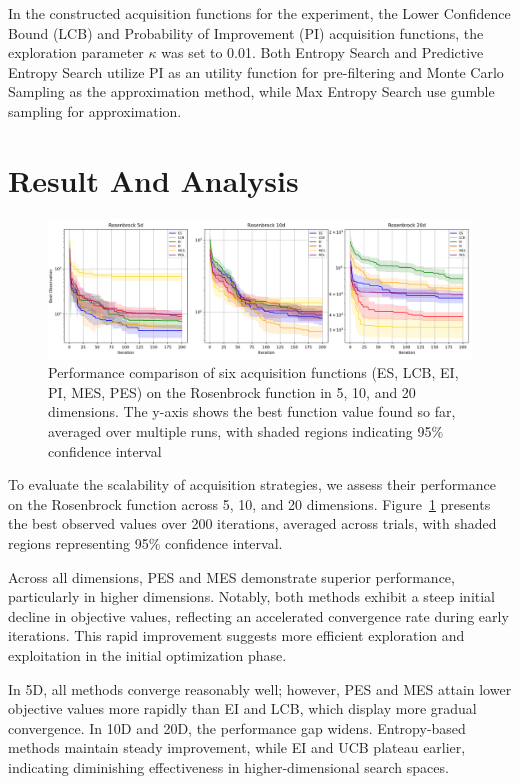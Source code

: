 \documentclass{ut-thesis}
\begin{document}
In the constructed acquisition functions for the experiment, the Lower Confidence Bound (LCB) and Probability of Improvement (PI) acquisition functions, the exploration parameter $\kappa$ was set to 0.01. Both Entropy Search and Predictive Entropy Search utilize PI as an utility function for pre-filtering and Monte Carlo Sampling as the approximation method, while Max Entropy Search use gumble sampling for approximation.
 

\section{Result And Analysis}

\begin{figure}[!t]
    \centering
    \includegraphics[width=\textwidth]{rosenbrock 51020d.png}
    \caption[Acquisition function comparison on Rosenbrock Function with different dimension]{Performance comparison of six acquisition functions (ES, LCB, EI, PI, MES, PES) on the Rosenbrock function in 5, 10, and 20 dimensions. The y-axis shows the best function value found so far, averaged over multiple runs, with shaded regions indicating 95\% confidence interval}
    \label{fig:rosenbrock_comparison}
\end{figure}

To evaluate the scalability of acquisition strategies, we assess their performance on the Rosenbrock function across 5, 10, and 20 dimensions. Figure~\ref{fig:rosenbrock_comparison} presents the best observed values over 200 iterations, averaged across trials, with shaded regions representing 95\% confidence interval.

Across all dimensions, PES and MES demonstrate superior performance, particularly in higher dimensions. Notably, both methods exhibit a steep initial decline in objective values, reflecting an accelerated convergence rate during early iterations. This rapid improvement suggests more efficient exploration and exploitation in the initial optimization phase.

In 5D, all methods converge reasonably well; however, PES and MES attain lower objective values more rapidly than EI and LCB, which display more gradual convergence. In 10D and 20D, the performance gap widens. Entropy-based methods maintain steady improvement, while EI and UCB plateau earlier, indicating diminishing effectiveness in higher-dimensional search spaces.
\end{document}
